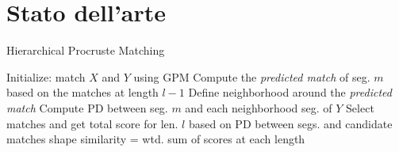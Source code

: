 \chapter{Stato dell'arte} 
\label{Cap2}
\begin{algorithm}
\caption{Hierarchical Procruste Matching} 
\label{algHPM}
\begin{algorithmic}[1]
\STATE Initialize: match $X$ and $Y$ using GPM
\STATE Compute the \textsl{predicted match} of seg. $m$ based on the matches at length $l-1$
\STATE Define neighborhood around the \textsl{predicted match}
\STATE Compute PD between seg. $m$ and each neighborhood seg. of $Y$
\ENDFOR
\STATE Select matches and get total score for len. $l$ based on PD between segs. and candidate matches
\ENDFOR
\STATE shape similarity = wtd. sum of scores at each length
\end{algorithmic}
\end{algorithm}